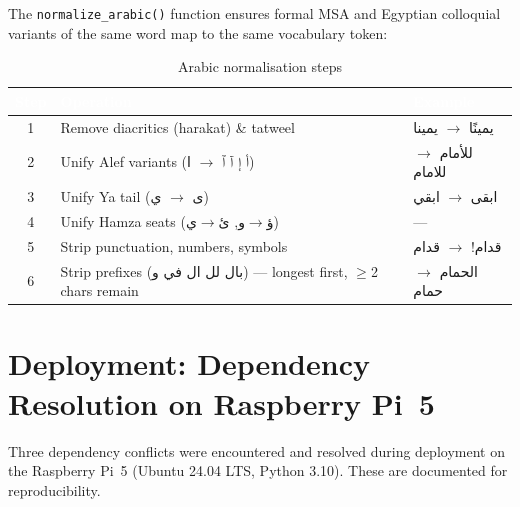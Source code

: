 \documentclass[12pt, a4paper]{report}
\newcommand{\thead}[1]{%
  \cellcolor{tableheader}\textcolor{white}{\textbf{#1}}}
\newcommand{\trow}[1]{\rowcolor{rowalt}#1}
\begin{document}
The \texttt{normalize\_arabic()} function ensures formal MSA and Egyptian colloquial
variants of the same word map to the same vocabulary token:

\begin{table}[h!]
\centering
\caption{Arabic normalisation steps}
\label{tab:normalisation}
\begin{tabularx}{\textwidth}{clX}
\toprule
\thead{Step} & \thead{Operation} & \thead{Example} \\
\midrule
\trow{1} & Remove diacritics (harakat) \& tatweel
         & \textarabic{يمينًا} $\rightarrow$ \textarabic{يمينا} \\
2 & Unify Alef variants (\textarabic{أ إ آ ٱ} $\rightarrow$ \textarabic{ا})
  & \textarabic{للأمام} $\rightarrow$ \textarabic{للامام} \\
\trow{3} & Unify Ya tail (\textarabic{ى} $\rightarrow$ \textarabic{ي})
         & \textarabic{ابقى} $\rightarrow$ \textarabic{ابقي} \\
4 & Unify Hamza seats (\textarabic{ؤ}$\rightarrow$\textarabic{و}, \textarabic{ئ}$\rightarrow$\textarabic{ي})
  & --- \\
\trow{5} & Strip punctuation, numbers, symbols & \textarabic{قدام!} $\rightarrow$ \textarabic{قدام} \\
6 & Strip prefixes (\textarabic{بال لل ال في و}) --- longest first, $\geq$2 chars remain
  & \textarabic{الحمام} $\rightarrow$ \textarabic{حمام} \\
\bottomrule
\end{tabularx}
\end{table}

\chapter{Deployment: Dependency Resolution on Raspberry Pi~5}

Three dependency conflicts were encountered and resolved during deployment on the
Raspberry Pi~5 (Ubuntu 24.04 LTS, Python 3.10). These are documented for
reproducibility.
\end{document}
